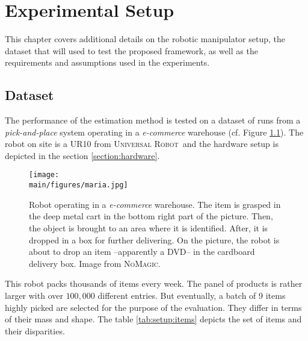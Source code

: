 \documentclass[/home/francois/latex/report/main.tex]{subfiles}
\begin{document}
\chapter{Experimental Setup}
\label{chapter:setup}

  This chapter covers additional details on the robotic manipulator setup, the dataset that will used to test the proposed framework, as well as the requirements and assumptions used in the experiments.

\section{Dataset}

The performance of the estimation method is tested on a dataset of runs from a \textit{pick-and-place} system operating in a \textit{e-commerce} warehouse (cf. Figure \ref{fig:setup:maria}). The robot on site is a UR10 from \textsc{Universal Robot}\texttrademark \ and the hardware setup is depicted in the section \ref{section:hardware}.

\begin{figure}[h]
  \centering
  \texttt{[image: \\main/figures/maria.jpg]}
  \caption{Robot operating in a \textit{e-commerce} warehouse. The item is grasped in the deep metal cart in the bottom right part of the picture. Then, the object is brought to an area where it is identified. After, it is dropped in a box for further delivering. On the picture, the robot is about to drop an item –apparently a DVD– in the cardboard delivery box. Image from \textsc{NoMagic}.}
  \label{fig:setup:maria}
\end{figure}

This robot packs thousands of items every week. The panel of products is rather larger with over $100{,}000$ different entries. But eventually, a batch of 9 items highly picked are selected for the purpose of the evaluation. They differ in terms of their mass and shape. The table \ref{tab:setup:items} depicts the set of items and their disparities.
\end{document}
